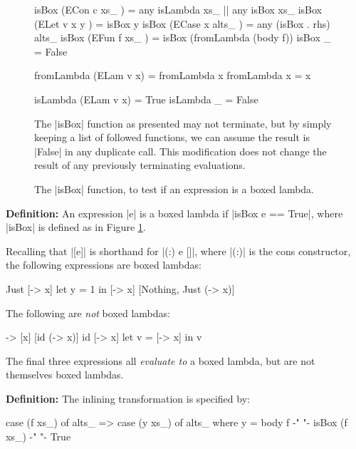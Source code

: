 \documentclass[preprint]{sigplanconf}
\newenvironment{definition}
    {\smallskip
     \noindent\textbf{Definition:}}
    {\noexample}
\begin{document}
\begin{figure}
\begin{code}
isBox (ECon c xs_     )  =  any isLambda xs_ ||  any isBox xs_
isBox (ELet v x y     )  =  isBox y
isBox (ECase x alts_  )  =  any (isBox . rhs) alts_
isBox (EFun f xs_     )  =  isBox (fromLambda (body f))
isBox _                  =  False

fromLambda (ELam v x)    = fromLambda x
fromLambda x             = x

isLambda (ELam v x)      = True
isLambda _               = False
\end{code}

The |isBox| function as presented may not terminate, but by simply keeping a list of followed functions, we can assume the result is |False| in any duplicate call. This modification does not change the result of any previously terminating evaluations.
\caption{The |isBox| function, to test if an expression is a boxed lambda.}
\label{fig:boxed_lambda}
\end{figure}

\begin{definition}
An expression |e| is a boxed lambda if |isBox e == True|, where |isBox| is defined as in Figure \ref{fig:boxed_lambda}.
\end{definition}

\begin{example}
Recalling that |[e]| is shorthand for |(:) e []|, where |(:)| is the cons constructor, the following expressions are boxed lambdas:

\ignore\begin{code}
[\x -> x]
Just [\x -> x]
let y = 1 in [\x -> x]
[Nothing, Just (\x -> x)]
\end{code}

\noindent The following are \textit{not} boxed lambdas:

\ignore\begin{code}
\x -> [x]
[id (\x -> x)]
id [\x -> x]
let v = [\x -> x] in v
\end{code}

The final three expressions all \textit{evaluate to} a boxed lambda, but are not themselves boxed lambdas.
\end{example}

\begin{definition}
The inlining transformation is specified by:

\ignore\begin{code}
case (f xs_) of alts_
    => case (y xs_) of alts_
    where
        y = body f
        {-"  "-} isBox (f xs_) {-"  "-} True
\end{code}\codeexample
\end{definition}\bigskip
\end{document}
